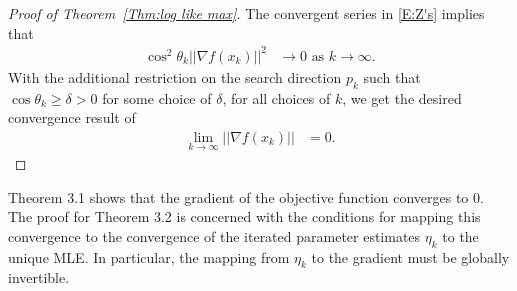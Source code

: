 \documentclass[oneside]{myumnStatThesis}
\begin{document}
\begin{proof}[Proof of Theorem~\ref{Thm:log like max}]
The convergent series in \eqref{E:Z's} implies that 
\begin{align*}
	\cos^2 \theta_k || \nabla f(x_k) ||^2 &\to 0 \text{ as } k \to \infty.
\end{align*}
With the additional restriction on the search direction $p_k$ such that $\cos \theta_k \geq \delta > 0$ for some choice 
of $\delta$, for all choices of $k$, we get the desired convergence result of
\begin{align*}
	\lim_{k \to \infty} || \nabla f(x_k) || &= 0.
\end{align*}

\end{proof}


Theorem 3.1 shows that the gradient of the objective function converges to 0.  The proof for Theorem 3.2 is concerned 
with the conditions for mapping this convergence to the convergence of the iterated parameter estimates $\eta_k$ to the 
unique MLE.  In particular, the mapping from $\eta_k$ to the gradient must be globally invertible.
\end{document}

